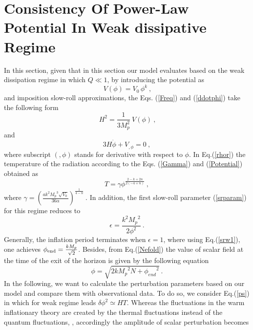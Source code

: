 \documentclass[12pt]{revtex4}
\begin{document}
\section{Consistency Of Power-Law Potential In Weak dissipative Regime }\label{weakpl}
In this section, given that in this section our model evaluates based on the weak dissipation regime in  which $Q\ll1$,  by introducing the potential as
 \begin{equation}\label{Potential}
\ V(\phi)={V_0}\,{\phi^{k}}~,
 \end{equation}
{and imposition }slow-roll approximations, the Eqs. (\ref{Freq}) and (\ref{ddotphi}) take the following form
\begin{equation}
\ H^2=\frac{1}{3M^2_p}{\ V(\phi)} \label{WeakFreq}~,%
\end{equation}
and
\begin{equation}\label{phidotweak}
 3H\dot \phi  + V_{,\phi} = 0~,
\end{equation}
where  subscript   $(,\phi)$ stands for derivative with respect to $\phi$.
In Eq.(\ref{rhor}) the temperature of the
radiation according to the Eqs. (\ref{Gamma}) and (\ref{Potential}) obtained as
\begin{equation}\label{TeWeak}
T=\gamma {\phi ^{\frac{{2 - k + 2n}}{{2( - 4 + n)}}}}~,
\end{equation}
where
 $\gamma={(\frac{{a{k^2}{M_p}^3\sqrt {{V_0}} }}{36 \alpha })^{\frac{1}{{4 - n}}}}~.$
In addition, the first slow-roll parameter (\ref{srparam}) for this regime reduces to
\begin{equation}
\epsilon=\frac{{{k^2}{M_p}^2}}{{2{\phi ^2}}}~.\label{srw1}
\end{equation}
Generally, the inflation period terminates when $\epsilon=1$, where using Eq.(\ref{srw1}), one achieves $\phi_{\textup{end}}=\frac{{k{M_p}}}{{\sqrt 2 }}$.
Besides, from  Eq.(\ref{Nefold}) the value of scalar field at the time  of the exit of the  horizon is given by the following equation
\begin{equation}
\phi  = \sqrt {2k{M_p}^2N + {\phi _{end}}^2}~.\label{phiexit}
\end{equation}
In the  following, we want to calculate the perturbation parameters based on our model and  {compare} them with observational data. To do so, we consider  Eq.(\ref{ps}) in  which for weak regime  leads  $\delta\phi^2\simeq H T$. Whereas the  fluctuations in the warm inflationary theory are created
by the thermal fluctuations instead of the quantum fluctuations, \cite{Herrera:2015aja}, accordingly the amplitude of scalar perturbation becomes
\end{document}
